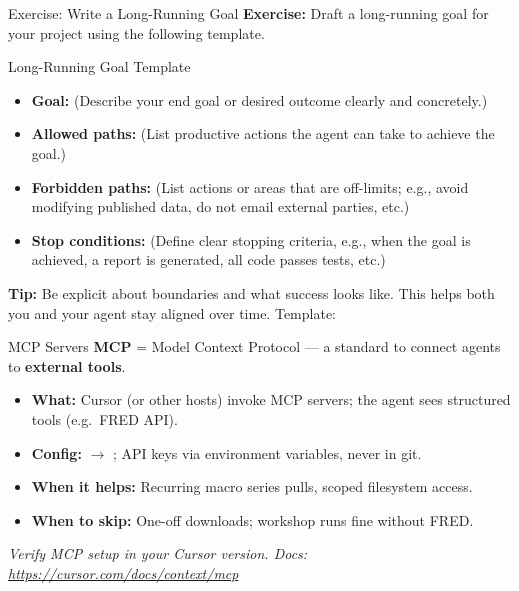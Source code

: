 \begin{frame}{Exercise: Write a Long-Running Goal}
  \textbf{Exercise:} Draft a long-running goal for your project using the following template.
  \vspace{0.8em}

  \begin{block}{Long-Running Goal Template}
    \begin{itemize}
      \item \textbf{Goal:} \textnormal{(Describe your end goal or desired outcome clearly and concretely.)}
      \item \textbf{Allowed paths:} \textnormal{(List productive actions the agent can take to achieve the goal.)}
      \item \textbf{Forbidden paths:} \textnormal{(List actions or areas that are off-limits; e.g., avoid modifying published data, do not email external parties, etc.)}
      \item \textbf{Stop conditions:} \textnormal{(Define clear stopping criteria, e.g., when the goal is achieved, a report is generated, all code passes tests, etc.)}
    \end{itemize}
  \end{block}
  \vspace{1em}
  \textbf{Tip:} Be explicit about boundaries and what success looks like. This helps both you and your agent stay aligned over time.
  \vspace{0.5em}
  {\small Template: }
\end{frame}

\begin{frame}{MCP Servers}
  \textbf{MCP} = Model Context Protocol --- a standard to connect agents to \textbf{external tools}.
  \begin{itemize}
    \item \textbf{What:} \textnormal{Cursor (or other hosts) invoke MCP servers; the agent sees structured tools (e.g.\ FRED API).}
    \item \textbf{Config:} \textnormal{ $\to$ ; API keys via environment variables, never in git.}
    \item \textbf{When it helps:} \textnormal{Recurring macro series pulls, scoped filesystem access.}
    \item \textbf{When to skip:} \textnormal{One-off downloads; workshop runs fine without FRED.}
  \end{itemize}
  \vspace{0.25em}
  {\scriptsize\textit{Verify MCP setup in your Cursor version. Docs: \url{https://cursor.com/docs/context/mcp}}}
\end{frame}

